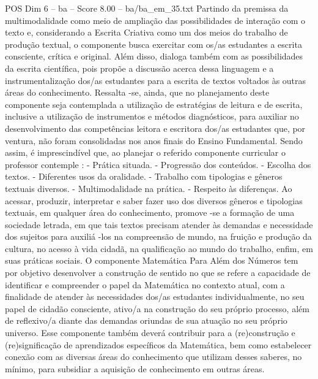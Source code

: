 \begin{textsample}{POS Dim 6 – ba – Score 8.00 – ba/ba\_em\_35.txt}
Partindo da premissa da multimodalidade como meio de ampliação das possibilidades de interação com o texto e, considerando a Escrita Criativa como um dos meios do trabalho de produção textual, o componente busca exercitar com os/as estudantes a escrita consciente, crítica e original.
Além disso, dialoga também com as possibilidades da escrita científica, pois propõe a discussão acerca dessa linguagem e a instrumentalização dos/as estudantes para a escrita de textos voltados às outras áreas do conhecimento.
Ressalta -se, ainda, que no planejamento deste componente seja contemplada a utilização de estratégias de leitura e de escrita, inclusive a utilização de instrumentos e métodos diagnósticos, para auxiliar no desenvolvimento das competências leitora e escritora dos/as estudantes que, por ventura, não foram consolidadas nos anos finais do Ensino Fundamental.
Sendo assim, é imprescindível que, ao planejar o referido componente curricular o professor contemple : - Prática situada. - Progressão dos conteúdos. - Escolha dos textos. - Diferentes usos da oralidade. - Trabalho com tipologias e gêneros textuais diversos. - Multimodalidade na prática. - Respeito às diferenças.
Ao acessar, produzir, interpretar e saber fazer uso dos diversos gêneros e tipologias textuais, em qualquer área do conhecimento, promove -se a formação de uma sociedade letrada, em que tais textos precisam atender às demandas e necessidade dos sujeitos para auxiliá -los na compreensão de mundo, na fruição e produção da cultura, no acesso à vida cidadã, na qualificação ao mundo do trabalho, enfim, em suas práticas sociais.
O componente Matemática Para Além dos Números tem por objetivo desenvolver a construção de sentido no que se refere a capacidade de identificar e compreender o papel da Matemática no contexto atual, com a finalidade de atender às necessidades dos/as estudantes individualmente, no seu papel de cidadão consciente, ativo/a na construção do seu próprio processo, além de reflexivo/a diante das demandas oriundas de sua atuação no seu próprio universo.
Esse componente também deverá contribuir para a (re)construção e (re)significação de aprendizados específicos da Matemática, bem como estabelecer conexão com as diversas áreas do conhecimento que utilizam desses saberes, no mínimo, para subsidiar a aquisição de conhecimento em outras áreas.

\end{textsample}
